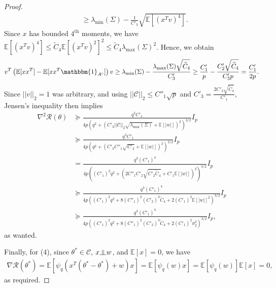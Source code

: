 \documentclass[10pt,a4paper]{amsart}
\newcommand{\indep}{\rotatebox[origin=c]{90}{$\models$}}
\begin{document}
\begin{proof}
\begin{align*}
&\geq \lambda_{\min}(\Sigma) - \frac{1}{C'_3}\sqrt{\mathbb{E}\left[(x^Tv)^4\right]}.
\end{align*}
Since $x$ has bounded $4^{\text{th}}$ moments, we have $\mathbb{E}\left[(x^Tv)^4\right] \leq \widetilde{C}_4\mathbb{E}\left[(x^Tv)^2\right]^2\leq \widetilde{C}_4\lambda_{\max}(\Sigma)^2$. Hence, we obtain
\begin{align*}
v^T\left(\mathbb{E}[xx^T] - \mathbb{E}[xx^T\mathbbm{1}_{A^c}]\right)v \geq \lambda_{\min}(\Sigma) - \frac{\lambda_{\max}(\Sigma)\sqrt{\widetilde{C}_4}}{C'_3} \geq \frac{C'_1}{p} - \frac{C'_2\sqrt{\widetilde{C}_4}}{C'_3p} = \frac{C'_1}{2p}. 
\end{align*}
Since $||v||_2 = 1$ was arbitrary, and using $||\mathcal{C}||_2 \leq C''_1\sqrt{p}$ and $C'_3 = \frac{2C'_2\sqrt{\widetilde{C}_4}}{C'_1}$, Jensen's inequality then implies
\begin{align*}
\nabla^2\mathcal{R}(\theta) &\succeq \frac{q^3C'_1}{4p\left(q^2 + \left(C'_3||\mathcal{C}||_2\sqrt{\lambda_{\max}(\Sigma)} + \mathbb{E}[|w|]\right)^2\right)^{3/2}}I_p \\
%
& \succeq \frac{q^3C'_1}{4p\left(q^2 + \left(C'_3C''_1\sqrt{C'_2} + \mathbb{E}[|w|]\right)^2\right)^{3/2}}I_p\\
&= \frac{q^3(C'_1)^4}{4p\left((C'_1)^2q^2 + \left(2C''_1C'_2\sqrt{C'_2\widetilde{C}_4} + C'_1\mathbb{E}[|w|]\right)^2\right)^{3/2}}I_p\\
&\succeq \frac{q^3(C'_1)^4}{4p\left((C'_1)^2q^2 + 8(C''_1)^2(C'_2)^3\widetilde{C}_4 + 2(C'_1)^2\mathbb{E}[|w|]^2\right)^{3/2}}I_p\\
&\succeq \frac{q^3(C'_1)^4}{4p\left((C'_1)^2q^2 + 8(C''_1)^2(C'_2)^3\widetilde{C}_4 + 2(C'_1)^2\sigma_2^2\right)^{3/2}}I_p,
\end{align*}
as wanted.

Finally, for (4), since $\theta^* \in \mathcal{C}$, $x \indep w$, and $\mathbb{E}[x] = 0$, we have 
\begin{align*}
\nabla \mathcal{R}(\theta^*) = \mathbb{E}\left[\psi_q(x^T(\theta^* - \theta^*) + w)x\right] = \mathbb{E}[\psi_q(w)x] = \mathbb{E}[\psi_q(w)]\mathbb{E}[x] = 0,
\end{align*}
as required.
\end{proof}
\end{document}
